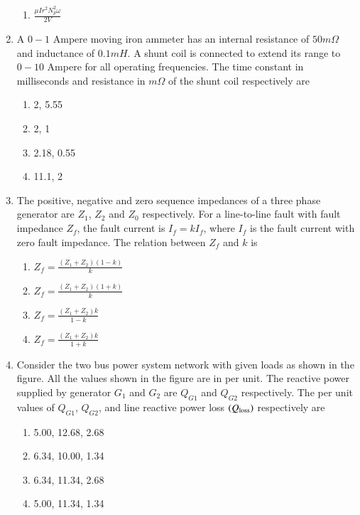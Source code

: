 \documentclass[journal]{IEEEtran}
\begin{document}
\begin{enumerate}
\begin{enumerate}
    \item $\frac{\mu I r^2 N_p^2 \omega}{2V}$
\end{enumerate}
\item A $0-1$ Ampere moving iron ammeter has an internal resistance of $50 m\Omega$ and inductance of $0.1 mH$. A shunt coil is connected to extend its range to $0-10$ Ampere for all operating frequencies. The time constant in milliseconds and resistance in $m\Omega$ of the shunt coil respectively are
\begin{enumerate}
      \item 2, 5.55
      \item 2, 1
      \item 2.18, 0.55
      \item 11.1, 2
  \end{enumerate}
  \item The positive, negative and zero sequence impedances of a three phase generator are $Z_1$, $Z_2$ and $Z_0$ respectively. For a line-to-line fault with fault impedance $Z_f$, the fault current is $I_f = k I_f$, where $I_f$ is the fault current with zero fault impedance. The relation between $Z_f$ and $k$ is
\begin{enumerate}
    \item $Z_f = \frac{(Z_1 + Z_2)(1 - k)}{k}$
    \item $Z_f = \frac{(Z_1 + Z_2)(1 + k)}{k}$
    \item $Z_f = \frac{(Z_1 + Z_2) k}{1 - k}$
    \item $Z_f = \frac{(Z_1 + Z_2) k}{1 + k}$
\end{enumerate}
\item Consider the two bus power system network with given loads as shown in the figure. All the values shown in the figure are in per unit. The reactive power supplied by generator $G_1$ and $G_2$ are $Q_{G1}$ and $Q_{G2}$ respectively. The per unit values of $Q_{G1}$, $Q_{G2}$, and line reactive power loss $\left(Q_{\text{loss}}\right)$ respectively are
 \begin{figure}[!ht]
    \centering
    \label{fig:power system network}
    \end{figure}
\begin{enumerate}
    \item 5.00, 12.68, 2.68
    \item 6.34, 10.00, 1.34
    \item 6.34, 11.34, 2.68
    \item 5.00, 11.34, 1.34
\end{enumerate}
\end{enumerate} 

\end{document}
